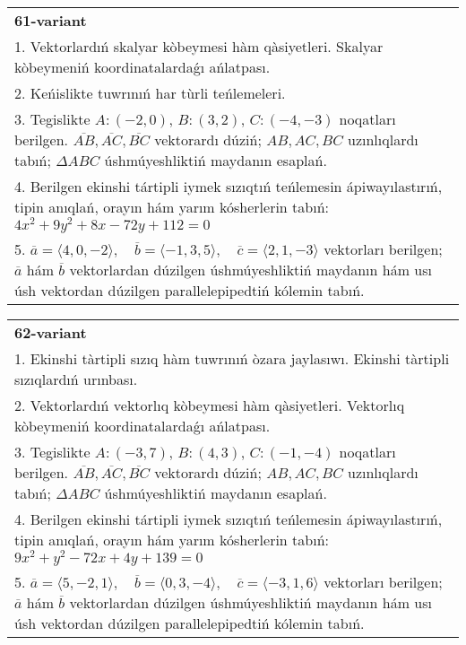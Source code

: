\documentclass{article}
\begin{document}
\begin{tabular}{m{17cm}}
\textbf{61-variant}\\
1. Vektorlardıń skalyar kòbeymesi hàm qàsiyetleri. Skalyar kòbeymeniń koordinatalardaǵı ańlatpası.\\

2. Keńislikte tuwrınıń har tùrli teńlemeleri. \\

3. Tegislikte $A: (-2, 0)$, $B: (3, 2)$, $C: (-4, -3)$ noqatları berilgen. $\overline{AB}, \overline{AC}, \overline{BC}$ vektorardı dúziń; $AB, AC, BC$ uzınlıqlardı tabıń; $\Delta ABC$ úshmúyeshliktiń maydanın esaplań. \\

4. Berilgen ekinshi tártipli iymek sızıqtıń teńlemesin ápiwayılastırıń, tipin anıqlań, orayın hám yarım kósherlerin tabıń: $4x^2+9y^2+8x-72y+112=0$\\

5. \(\overline{a} = \langle 4, 0, -2 \rangle, \quad \overline{b} = \langle -1, 3, 5 \rangle, \quad \overline{c} = \langle 2, 1, -3 \rangle\) vektorları berilgen; \(\overline{a}\) hám \(\overline{b}\) vektorlardan dúzilgen úshmúyeshliktiń maydanın hám usı úsh vektordan dúzilgen parallelepipedtiń kólemin tabıń.
\end{tabular}
\vspace{1cm}


\begin{tabular}{m{17cm}}
\textbf{62-variant}\\
1. Ekinshi tàrtipli sızıq hàm tuwrınıń òzara jaylasıwı. Ekinshi tàrtipli sızıqlardıń urınbası.\\

2. Vektorlardıń vektorlıq kòbeymesi hàm qàsiyetleri. Vektorlıq kòbeymeniń koordinatalardaǵı ańlatpası. \\

3. Tegislikte $A: (-3, 7)$, $B: (4, 3)$, $C: (-1, -4)$ noqatları berilgen. $\overline{AB}, \overline{AC}, \overline{BC}$ vektorardı dúziń; $AB, AC, BC$ uzınlıqlardı tabıń; $\Delta ABC$ úshmúyeshliktiń maydanın esaplań. \\

4. Berilgen ekinshi tártipli iymek sızıqtıń teńlemesin ápiwayılastırıń, tipin anıqlań, orayın hám yarım kósherlerin tabıń: $9x^2+y^2-72x+4y+139=0$\\

5. \(\overline{a} = \langle 5, -2, 1 \rangle, \quad \overline{b} = \langle 0, 3, -4 \rangle, \quad \overline{c} = \langle -3, 1, 6 \rangle\) vektorları berilgen; \(\overline{a}\) hám \(\overline{b}\) vektorlardan dúzilgen úshmúyeshliktiń maydanın hám usı úsh vektordan dúzilgen parallelepipedtiń kólemin tabıń.
\end{tabular}
\vspace{1cm}
\end{document}
